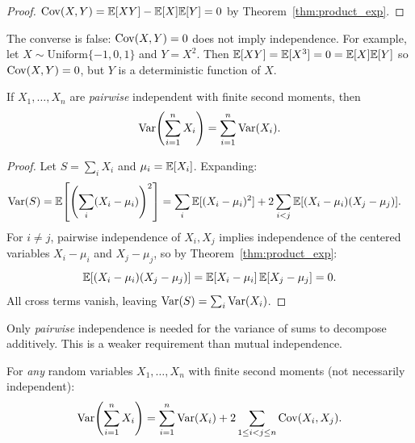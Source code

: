 \documentclass[11pt,a4paper]{article}
\begin{document}
\begin{proof}
$\operatorname{Cov}(X, Y) = \mathbb{E}[XY] - \mathbb{E}[X]\mathbb{E}[Y] = 0$ by
Theorem~\ref{thm:product_exp}.
\end{proof}

\begin{remark}
The converse is false: $\operatorname{Cov}(X, Y) = 0$ does not imply
independence.  For example, let $X \sim \text{Uniform}\{-1, 0, 1\}$
and $Y = X^2$.  Then $\mathbb{E}[XY] = \mathbb{E}[X^3] = 0 = \mathbb{E}[X]\mathbb{E}[Y]$ so
$\operatorname{Cov}(X, Y) = 0$, but $Y$ is a deterministic function of $X$.
\end{remark}

\begin{keyresult}[title={Variance of Sum of Independent RVs}]
\begin{corollary}
\label{cor:var_sum}
If $X_1, \ldots, X_n$ are \emph{pairwise} independent with
finite second moments, then
\begin{equation}
  \operatorname{Var}\!\left(\sum_{i=1}^n X_i\right)
  = \sum_{i=1}^n \operatorname{Var}(X_i).
  \label{eq:var_sum}
\end{equation}
\end{corollary}
\end{keyresult}

\begin{proof}
Let $S = \sum_i X_i$ and $\mu_i = \mathbb{E}[X_i]$.  Expanding:
\begin{align}
  \operatorname{Var}(S)
  &= \mathbb{E}\!\left[\left(\sum_i (X_i - \mu_i)\right)^2\right]
  = \sum_i \mathbb{E}[(X_i - \mu_i)^2]
    + 2 \sum_{i < j} \mathbb{E}[(X_i - \mu_i)(X_j - \mu_j)].
  \label{eq:var_sum_expand}
\end{align}
For $i \neq j$, pairwise independence of $X_i, X_j$ implies
independence of the centered variables $X_i - \mu_i$ and
$X_j - \mu_j$, so by Theorem~\ref{thm:product_exp}:
\begin{equation}
  \mathbb{E}[(X_i - \mu_i)(X_j - \mu_j)]
  = \mathbb{E}[X_i - \mu_i]\, \mathbb{E}[X_j - \mu_j] = 0.
  \label{eq:cross_zero}
\end{equation}
All cross terms vanish, leaving
$\operatorname{Var}(S) = \sum_i \operatorname{Var}(X_i)$.
\end{proof}

\begin{remark}
Only \emph{pairwise} independence is needed for the variance of
sums to decompose additively.  This is a weaker requirement than
mutual independence.
\end{remark}

\begin{proposition}
\label{prop:var_sum_general}
For \emph{any} random variables $X_1, \ldots, X_n$ with finite
second moments (not necessarily independent):
\begin{equation}
  \operatorname{Var}\!\left(\sum_{i=1}^n X_i\right)
  = \sum_{i=1}^n \operatorname{Var}(X_i)
    + 2 \sum_{1 \leq i < j \leq n} \operatorname{Cov}(X_i, X_j).
  \label{eq:var_sum_general}
\end{equation}
\end{proposition}
\end{document}
